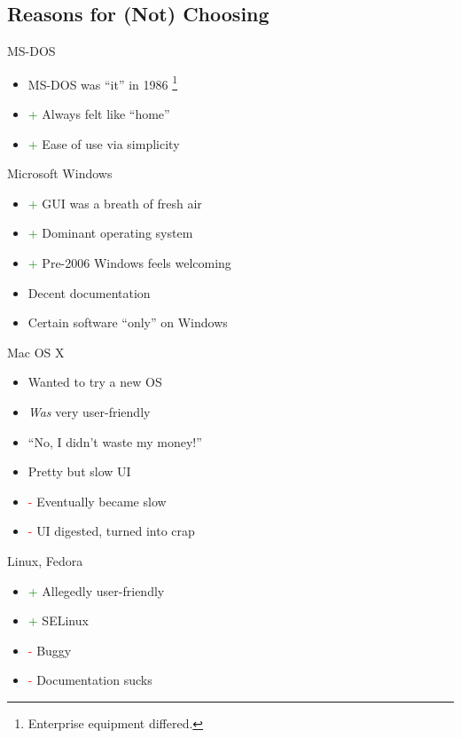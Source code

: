 \documentclass{beamer}
\newcommand{\good}{\textcolor{green}{+ }}
\newcommand{\bad}{\textcolor{red}{- }}
\begin{document}
		\subsection{Reasons for (Not) Choosing}
			\begin{frame}{MS-DOS}
				\begin{itemize}
					\item MS-DOS was ``it'' in 1986 \footnote{Enterprise equipment differed.}
					\item \good Always felt like ``home''
					\item \good Ease of use via simplicity
				\end{itemize}
			\end{frame}
			\begin{frame}{Microsoft Windows}
				\begin{itemize}
					\item \good GUI was a breath of fresh air
					\item \good Dominant operating system
					\item \good Pre-2006 Windows feels welcoming
					\item Decent documentation
					\item Certain software ``only'' on Windows
				\end{itemize}
			\end{frame}
			\begin{frame}{Mac OS X}
				\begin{itemize}
					\item Wanted to try a new OS
					\item \textit{Was} very user-friendly
					\item ``No, I didn't waste my money!''
					\item Pretty but slow UI
					\item \bad Eventually became slow
					\item \bad UI digested, turned into crap
				\end{itemize}
			\end{frame}
			\begin{frame}{Linux, Fedora}
				\begin{itemize}
					\item \good Allegedly user-friendly
					\item \good SELinux
					\item \bad Buggy
					\item \bad Documentation sucks
				\end{itemize}
			\end{frame}
\end{document}
